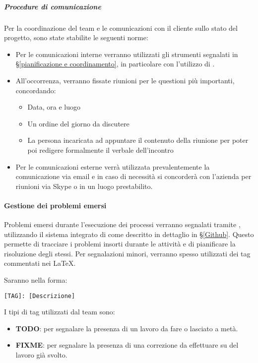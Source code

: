 			\subparagraph{Procedure di comunicazione}
			Per la coordinazione del team e le comunicazioni con il cliente sullo stato del progetto, sono state stabilite le seguenti norme:
			\begin{itemize}
				\item Per le comunicazioni interne verranno utilizzati gli strumenti segnalati in \S\ref{pianificazione e coordinamento}, in particolare con l'utilizzo di .
				\item All'occorrenza, verranno fissate riunioni per le questioni più importanti, concordando:
					\begin{itemize}
						\item Data, ora e luogo
						\item Un ordine del giorno da discutere
						\item La persona incaricata ad appuntare il contenuto della riunione per poter poi redigere formalmente il verbale dell'incontro
					\end{itemize}
				\item Per le comunicazioni esterne verrà utilizzata prevalentemente la comunicazione via email e in caso di necessità si concorderà con l'azienda per riunioni via Skype o in un luogo prestabilito. %
			\end{itemize}


    		\paragraph{Gestione dei problemi emersi}
			Problemi emersi durante l'esecuzione dei processi verranno segnalati tramite , utilizzando il sistema integrato di  come descritto in dettaglio in \S\ref{Github}. Questo permette di tracciare i problemi insorti durante le attività e di pianificare la risoluzione degli stessi.
			Per segnalazioni minori, verranno spesso utilizzati dei tag commentati nei  \LaTeX.
			\begin{samepage}
				Saranno nella forma:
				\begin{center}
					\texttt{[TAG]: [Descrizione]}
				\end{center}
			\end{samepage}
			I tipi di tag utilizzati dal team sono:
			\begin{itemize}
				\item \textbf{TODO}: per segnalare la presenza di un lavoro da fare o lasciato a metà.
				\item \textbf{FIXME}: per segnalare la presenza di una correzione da effettuare su del lavoro già svolto.
			\end{itemize}

